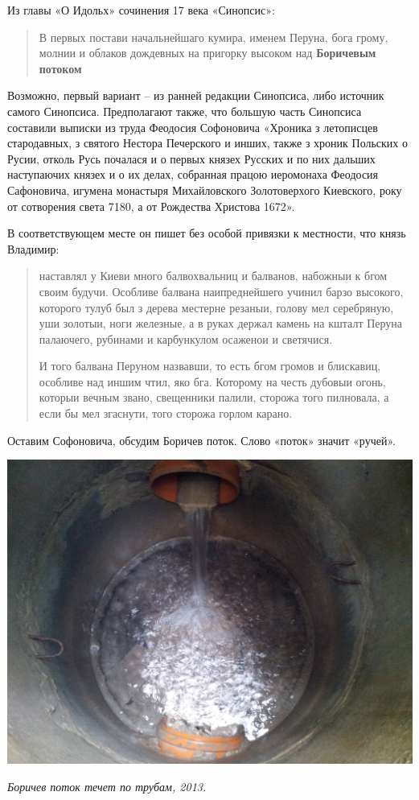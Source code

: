 Из главы «О Идольх» сочинения 17 века «Синопсис»:

\begin{quotation}
В первых постави начальнейшаго кумира, именем Перуна, бога грому, молнии и облаков дождевных на пригорку высоком над \textbf{Боричевым потоком}
\end{quotation}

Возможно, первый вариант – из ранней редакции Синопсиса, либо источник самого Синопсиса. Предполагают также, что большую часть Синопсиса составили выписки из труда Феодосия Софоновича «Хроника з летописцев стародавных, з святого Нестора Печерского и инших, также з хроник Польских о Русии, отколь Русь почалася и о первых князех Русских и по них дальших наступаючих князех и о их делах, собранная працою иеромонаха Феодосия Сафоновича, игумена монастыря Михайловского Золотоверхого Киевского, року от сотворения света 7180, а от Рождества Христова 1672».

В соответствующем месте он пишет без особой привязки к местности, что князь Владимир:

\begin{quotation}
наставлял у Киеви много балвохвальниц и балванов, набожныи к бгом своим будучи. Особливе балвана наипреднейшего учинил барзо высокого, которого тулуб был з дерева местерне резаныи, голову мел серебряную, уши золотыи, ноги железные, а в руках держал камень на кшталт Перуна палаючего, рубинами и карбункулом осаженои и светячися.

И того балвана Перуном назвавши, то есть бгом громов и блискавиц, особливе над иншим чтил, яко бга. Которому на честь дубовыи огонь, которыи вечным звано, свещенники палили, сторожа того пилновала, а если бы мел згаснути, того сторожа горлом карано.
\end{quotation}

Оставим Софоновича, обсудим Боричев поток. Слово «поток» значит «ручей».

\begin{center}
\includegraphics[width=0.85\linewidth]{chast-colebanie-osnov/borichev-tok/s_borichev-IMG_20131013_150512.jpg}

\textit{Боричев поток течет по трубам, 2013.}
\end{center}

